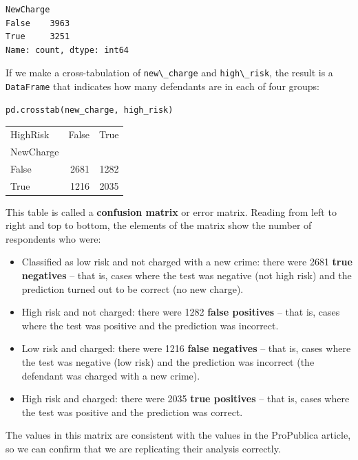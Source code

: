 \begin{lstlisting}[style=output]
NewCharge
False    3963
True     3251
Name: count, dtype: int64
\end{lstlisting}

If we make a cross-tabulation of \passthrough{\lstinline!new\_charge!}
and \passthrough{\lstinline!high\_risk!}, the result is a
\passthrough{\lstinline!DataFrame!} that indicates how many defendants
are in each of four groups:

\begin{lstlisting}[language=Python,style=source]
pd.crosstab(new_charge, high_risk)
\end{lstlisting}

\begin{tabular}{lrr}
\midrule
HighRisk & False & True \\
NewCharge &  &  \\
\midrule
False & 2681 & 1282 \\
True & 1216 & 2035 \\
\midrule
\end{tabular}

This table is called a \textbf{confusion matrix} or error matrix.
Reading from left to right and top to bottom, the elements of the matrix
show the number of respondents who were:

\begin{itemize}
\item
  Classified as low risk and not charged with a new crime: there were
  2681 \textbf{true negatives} -- that is, cases where the test was
  negative (not high risk) and the prediction turned out to be correct
  (no new charge).
\item
  High risk and not charged: there were 1282 \textbf{false positives} --
  that is, cases where the test was positive and the prediction was
  incorrect.
\item
  Low risk and charged: there were 1216 \textbf{false negatives} -- that
  is, cases where the test was negative (low risk) and the prediction
  was incorrect (the defendant was charged with a new crime).
\item
  High risk and charged: there were 2035 \textbf{true positives} -- that
  is, cases where the test was positive and the prediction was correct.
\end{itemize}

The values in this matrix are consistent with the values in the
ProPublica article, so we can confirm that we are replicating their
analysis correctly.

